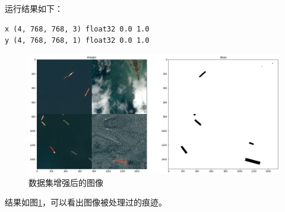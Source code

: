 运行结果如下：

\begin{lstlisting}
x (4, 768, 768, 3) float32 0.0 1.0
y (4, 768, 768, 1) float32 0.0 1.0
\end{lstlisting}

\begin{figure}[htbp]
\centering
\includegraphics[width=1\linewidth]{body/preprocessing_pic/7}
\caption{数据集增强后的图像}
\label{fig::preprocessing7}
\end{figure}

结果如图\ref{fig::preprocessing7}，可以看出图像被处理过的痕迹。
